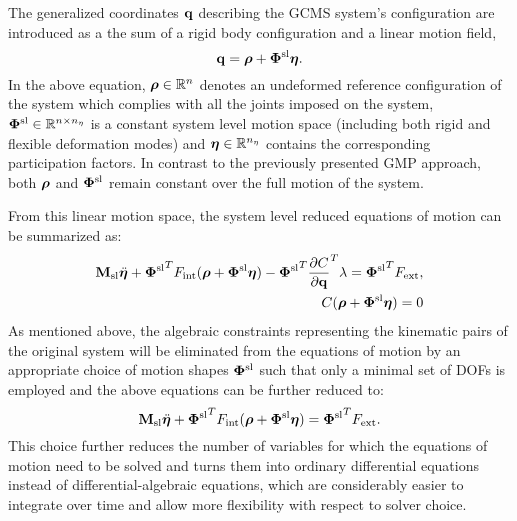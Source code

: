 The generalized coordinates $\mathbf q$ describing the GCMS system's configuration are introduced as a the sum of a rigid body configuration and a linear motion field,
\begin{equation}
\mathbf q = \bm \rho + \bm \Phi^{\rm sl} \bm \eta.
\end{equation}
In the above equation, $\bm \rho \in \mathbb{R}^{n}$ denotes an undeformed reference configuration of the system which complies with all the joints imposed on the system, $\bm \Phi^{\rm sl} \in \mathbb{R}^{n\times n_{\eta}}$ is a constant system level motion space (including both rigid and flexible deformation modes) and $\bm \eta\in \mathbb{R}^{n_{\eta}}$ contains the corresponding participation factors. In contrast to the previously presented GMP approach, both $\bm \rho$ and $\bm \Phi^{\rm sl}$ remain constant over the full motion of the system. 

From this linear motion space, the system level reduced equations of motion can be summarized as:
\begin{eqnarray} \label{eq_eom-gmp1}
\mathbf M_{\rm sl} \ddot{\bm \eta} + {\bm \Phi^{\rm sl}}^TF_{\mathrm{int}}(\bm \rho + \bm \Phi^{\rm sl} \bm \eta) - {\bm \Phi^{\rm sl}}^T\frac{\partial C}{\partial \mathbf q}^T\lambda= {\bm \Phi^{\rm sl}}^TF_{\mathrm{ext}}, \\
C(\bm \rho + \bm \Phi^{\rm sl} \bm \eta) = 0
\end{eqnarray}
As mentioned above, the algebraic constraints representing the kinematic pairs of the original system will be eliminated from the equations of motion by an appropriate choice of motion shapes $\bm \Phi^{\rm sl}$ such that only a minimal set of DOFs is employed and the above equations can be further reduced to:
\begin{equation} \label{eq_eom-gmp}
\mathbf M_{\rm sl} \ddot{\bm \eta} + {\bm \Phi^{\rm sl}}^TF_{\mathrm{int}}(\bm \rho + \bm \Phi^{\rm sl} \bm \eta) = {\bm \Phi^{\rm sl}}^TF_{\mathrm{ext}}.
\end{equation}
This choice further reduces the number of variables for which the equations of motion need to be solved and turns them into ordinary differential equations instead of differential-algebraic equations, which are considerably easier to integrate over time and allow more flexibility with respect to solver choice. 

